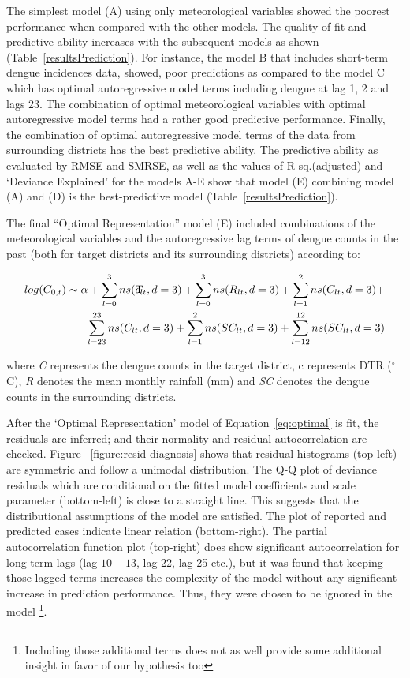 \documentclass{bmcart}
\begin{document}
The simplest model (A) using only meteorological variables showed the poorest performance when compared with the other models. The quality of fit and predictive ability increases with the subsequent models 
as shown (Table~\ref{resultsPrediction}).  For instance, the model B that includes short-term dengue incidences data, showed, poor predictions as compared to the model C which has optimal autoregressive model terms including dengue at lag 1, 2 and lags 23. The combination of optimal meteorological variables with optimal autoregressive model terms had a 
rather good predictive performance. Finally, the combination of optimal autoregressive model terms of the data from surrounding districts has the best predictive ability. The predictive ability
as evaluated by RMSE and SMRSE, as well as the values of R-sq.(adjusted) and `Deviance Explained' for the models A-E show that model (E) combining model (A) and (D) is the best-predictive model (Table~\ref{resultsPrediction}).

The final ``Optimal Representation'' model (E) included combinations of the meteorological variables and the autoregressive lag terms of dengue counts in the past (both for target districts and its surrounding districts) according to:

\begin{equation}
\begin{aligned}
\label{eq:optimal}
log (C_{0,t}) \sim \alpha +  \sum_{l=0}^{3} ns(\rlap{T}c _ {lt}, d =3) + \sum_{l=0}^{3} ns(R_ {lt}, d =3) +\sum_{l=1}^{2} ns(C_ {lt}, d =3)  + \\
\sum_{l=23}^{23} ns(C_ {lt}, d =3) + \sum_{l=1}^{2} ns(SC_ {lt}, d =3) + \sum_{l=12}^{12} ns(SC_ {lt}, d =3)
\end{aligned}
\end{equation}

where \textit{C} represents the dengue counts in the target district, c represents DTR ($^{\circ}$C), \textit{R} denotes the mean monthly rainfall (mm) and \textit{SC} denotes the dengue counts in the surrounding districts. 


After the `Optimal Representation' model of Equation~\ref{eq:optimal} is fit, the residuals are inferred; and their normality and residual autocorrelation are checked. Figure ~\ref{figure:resid-diagnosis} shows that residual histograms (top-left) are symmetric and follow a unimodal distribution. The Q-Q plot of deviance residuals which are conditional on the fitted model coefficients and scale parameter (bottom-left) is close to a straight line. This suggests that the distributional assumptions of the model are satisfied. The plot of reported and predicted cases indicate linear relation (bottom-right). The partial autocorrelation function plot (top-right) does show significant autocorrelation for long-term lags (lag $10-13$, lag 22, lag 25 etc.), but it was found that keeping those lagged terms increases the complexity of the model without any significant increase in prediction performance. Thus, they were chosen to be ignored in the model \footnote{Including those additional terms does not as well provide some additional insight in favor of our hypothesis too}. 
\end{document}

